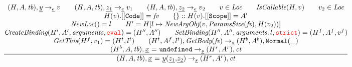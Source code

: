 \[\begin{array}{l@{~~}l@{~~}ll}
\frac{\begin{matrix}
\evale, \ir{y} \rightarrow_{\ir\expr} v
\rulesep
\evale, \ir{z_1} \rightarrow_{\ir\expr} v_1
\rulesep
\evale, \ir{z_2} \rightarrow_{\ir\expr} v_2
\rulesep
v \in \Loc
\rulesep
\hf{IsCallable}(H,v)
\rulesep
v_2 \in \Loc
\\
H(v).{\tt[[Code]]} = \emph{fv}
\rulesep
\{\}::H(v).{\tt[[Scope]]} = A'
\\
\hf{NewLoc}() = l
\rulesep
H' = H[l\mapsto \hf{NewArgObj}(v, \hf{ParamsSize}(\emph{fv}), H(v_2))]
\\
\hf{CreateBinding}(H', A', \hf{arguments}, \eval) = \respp%
\rulesep
\hf{SetBinding}(H'', A'', \hf{arguments}, l, \strict) = (H^f, A^f, v^f)%
\\
\hf{GetThis}(H^f,v_1) = (H^t,l^t)
\rulesep
(H^t, A^f, l^t), \hf{GetBody}(\emph{fv}) \rightarrow_{\ir\stmt} (H^b, A^b), {\tt Normal}(\_)
\\
(H^b, A, \tb), \irid\ {\tt =} \ \undef \rightarrow_{\ir\stmt} (H^r,A^r), \ct
\end{matrix}}{\begin{matrix}
\state, \ircall \rightarrow_{\ir\stmt}
(H^r,A^r), \ct
\end{matrix}}
\\[2em]
\end{array}
\]

